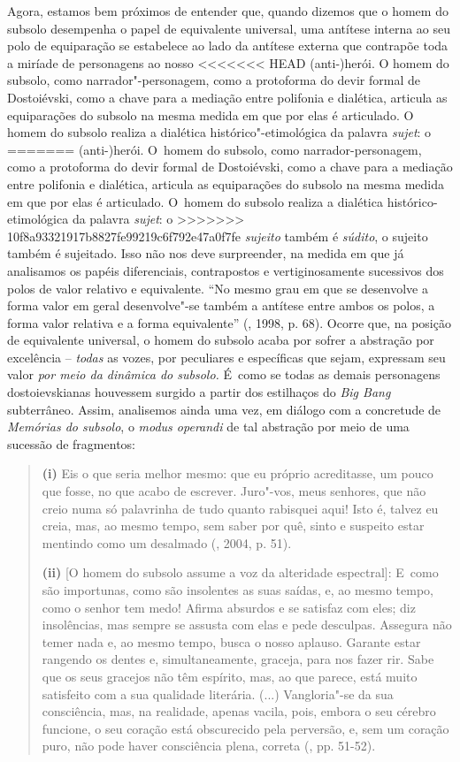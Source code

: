 {Agora, estamos bem próximos de entender que, quando dizemos que o homem
do subsolo desempenha o papel de equivalente universal, uma antítese
interna ao seu polo de equiparação se estabelece ao lado da antítese
externa que contrapõe toda a miríade de personagens ao nosso
<<<<<<< HEAD
(anti-)herói. O homem do subsolo, como narrador"-personagem, como a
protoforma do devir formal de Dostoiévski, como a chave para a mediação
entre polifonia e dialética, articula as equiparações do subsolo na
mesma medida em que por elas é articulado. O homem do subsolo realiza a
dialética histórico"-etimológica da palavra \emph{sujet}: o
=======
(anti-)herói. O~homem do subsolo, como narrador-personagem, como a
protoforma do devir formal de Dostoiévski, como a chave para a mediação
entre polifonia e dialética, articula as equiparações do subsolo na
mesma medida em que por elas é articulado. O~homem do subsolo realiza a
dialética histórico-etimológica da palavra \emph{sujet}: o
>>>>>>> 10f8a93321917b8827fe99219c6f792e47a0f7fe
\emph{sujeito} também é \emph{súdito}, o sujeito também é sujeitado.
Isso não nos deve surpreender, na medida em que já analisamos os papéis
diferenciais, contrapostos e vertiginosamente sucessivos dos polos de
valor relativo e equivalente. ``No mesmo grau em que se desenvolve a
forma valor em geral desenvolve"-se também a antítese entre ambos os
polos, a forma valor relativa e a forma equivalente'' (, 1998, p.
68). Ocorre que, na posição de equivalente universal, o homem do subsolo
acaba por sofrer a abstração por excelência -- \emph{todas} as vozes,
por peculiares e específicas que sejam, expressam seu valor \emph{por
meio da dinâmica do subsolo.} É~como se todas as demais personagens
dostoievskianas houvessem surgido a partir dos estilhaços do \emph{Big
Bang} subterrâneo. Assim, analisemos ainda uma vez, em diálogo com a
concretude de \emph{Memórias do subsolo}, o \emph{modus operandi} de tal
abstração por meio de uma sucessão de fragmentos:

\begin{quote}
\textbf{(i)} Eis o que seria melhor mesmo: que eu próprio acreditasse,
um pouco que fosse, no que acabo de escrever. Juro"-vos, meus senhores,
que não creio numa só palavrinha de tudo quanto rabisquei aqui! Isto é,
talvez eu creia, mas, ao mesmo tempo, sem saber por quê, sinto e
suspeito estar mentindo como um desalmado (, 2004, p. 51).

\textbf{(ii)} {[}O homem do subsolo assume a voz da alteridade
espectral{]}: E~como são importunas, como são insolentes as suas saídas,
e, ao mesmo tempo, como o senhor tem medo! Afirma absurdos e se satisfaz
com eles; diz insolências, mas sempre se assusta com elas e pede
desculpas. Assegura não temer nada e, ao mesmo tempo, busca o nosso
aplauso. Garante estar rangendo os dentes e, simultaneamente, graceja,
para nos fazer rir. Sabe que os seus gracejos não têm espírito, mas, ao
que parece, está muito satisfeito com a sua qualidade literária. (...)
Vangloria"-se da sua consciência, mas, na realidade, apenas vacila, pois,
embora o seu cérebro funcione, o seu coração está obscurecido pela
perversão, e, sem um coração puro, não pode haver consciência plena,
correta (, pp. 51-52).


\end{quote}}
